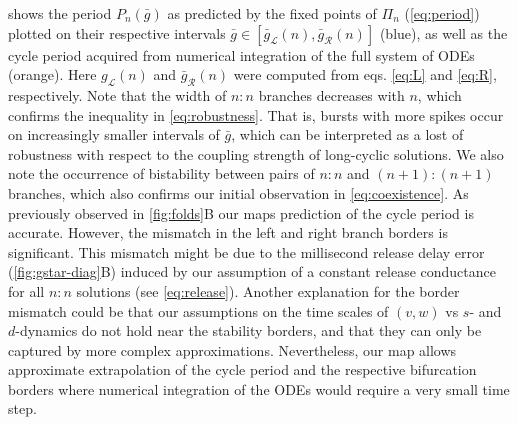  shows the period $P_{n}(\bar g)$ as predicted by the fixed points of $\Pi_{n}$ (\cref{eq:period}) plotted on their respective intervals $\bar g \in [\bar g_{\mathcal{L}}(n),\bar g_{\mathcal{R}}(n)]$ (blue), as well as the cycle period acquired from numerical integration of the full system of ODEs (orange).
Here $g_{\mathcal{L}}(n)$ and $\bar g_{\mathcal{R}}(n)$ were computed from eqs. \ref{eq:L} and \ref{eq:R}, respectively.
Note that the width of $n:n$ branches decreases with $n$, which confirms the inequality in \cref{eq:robustness}.
That is, bursts with more spikes occur on increasingly smaller intervals of $\bar g$, which can be interpreted as a lost of robustness with respect to the coupling strength of long-cyclic solutions.
We also note the occurrence of bistability between pairs of $n:n$ and $(n+1):(n+1)$ branches, which also confirms our initial observation in
\cref{eq:coexistence}.
As previously observed in \cref{fig:folds}B our maps prediction of the cycle period is accurate.
However, the mismatch in the left and right branch borders is significant.
This mismatch might be due to the millisecond release delay error (\cref{fig:gstar-diag}B) induced by our assumption of a constant release conductance for all $n:n$ solutions (see \cref{eq:release}).
Another explanation for the border mismatch could be that our assumptions on the time scales of $(v,w)$ vs $s$- and $d$-dynamics do not hold near the stability borders, and that they can only be captured by more complex approximations.
Nevertheless, our map allows approximate extrapolation of the cycle period and the respective bifurcation borders where numerical integration of the ODEs would require a very small time step.

